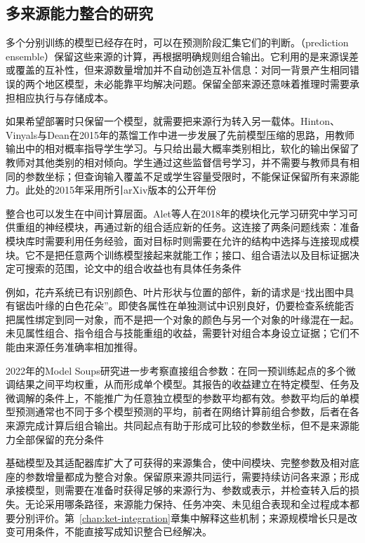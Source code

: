 \subsection{多来源能力整合的研究}
\label{sec:ket-overview-history-integration}

多个分别训练的模型已经存在时，可以在预测阶段汇集它们的判断。（prediction ensemble）保留这些来源的计算，再根据明确规则组合输出。它利用的是来源误差或覆盖的互补性，但来源数量增加并不自动创造互补信息：对同一背景产生相同错误的两个地区模型，未必能靠平均解决问题。保留全部来源还意味着推理时需要承担相应执行与存储成本。

如果希望部署时只保留一个模型，就需要把来源行为转入另一载体。Hinton、Vinyals与Dean在2015年的蒸馏工作中进一步发展了先前模型压缩的思路，用教师输出中的相对概率指导学生学习。与只给出最大概率类别相比，软化的输出保留了教师对其他类别的相对倾向。学生通过这些监督信号学习，并不需要与教师具有相同的参数坐标；但查询输入覆盖不足或学生容量受限时，不能保证保留所有来源能力。此处的2015年采用所引arXiv版本的公开年份

整合也可以发生在中间计算层面。Alet等人在2018年的模块化元学习研究中学习可供重组的神经模块，再通过新的组合适应新的任务。这连接了两条问题线索：准备模块库时需要利用任务经验，面对目标时则需要在允许的结构中选择与连接现成模块。它不是把任意两个训练模型接起来就能工作；接口、组合语法以及目标证据决定可搜索的范围，论文中的组合收益也有具体任务条件

例如，花卉系统已有识别颜色、叶片形状与位置的部件，新的请求是“找出图中具有锯齿叶缘的白色花朵”。即使各属性在单独测试中识别良好，仍要检查系统能否把属性绑定到同一对象，而不是把一个对象的颜色与另一个对象的叶缘混在一起。未见属性组合、指令组合与技能重组的收益，需要针对组合本身设立证据；它们不能由来源任务准确率相加推得。

2022年的Model Soups研究进一步考察直接组合参数：在同一预训练起点的多个微调结果之间平均权重，从而形成单个模型。其报告的收益建立在特定模型、任务及微调解的条件上，不能推广为任意独立模型的参数平均都有效。参数平均后的单模型预测通常也不同于多个模型预测的平均，前者在网络计算前组合参数，后者在各来源完成计算后组合输出。共同起点有助于形成可比较的参数坐标，但不是来源能力全部保留的充分条件

基础模型及其适配器库扩大了可获得的来源集合，使中间模块、完整参数及相对底座的参数增量都成为整合对象。保留原来源共同运行，需要持续访问各来源；形成承接模型，则需要在准备时获得足够的来源行为、参数或表示，并检查转入后的损失。无论采用哪条路径，来源能力保持、任务冲突、未见组合表现和全过程成本都要分别评价。第~\ref{chap:ket-integration}章集中解释这些机制；来源规模增长只是改变可用条件，不能直接写成知识整合已经解决。

